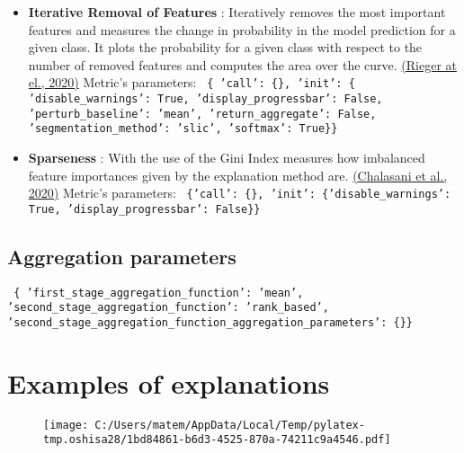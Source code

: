 \documentclass{article}%
\begin{document}
\begin{itemize}
{                'similarity\_func': difference\}\} \newline%
%
}%
\item%
\textbf{Iterative Removal of Features}%
: Iteratively removes the most important features and measures the change in probability in the model prediction for a given class. It plots the probability for a given class with respect to the number of removed features and computes the area over the curve.%
\href{https://arxiv.org/abs/2003.08747}{(Rieger at el., 2020)}%
\newline%
%
Metric's parameters: \newline%
%
\texttt{%
\{   'call': \{\},\newline%
    'init': \{   'disable\_warnings': True,\newline%
                'display\_progressbar': False,\newline%
                'perturb\_baseline': 'mean',\newline%
                'return\_aggregate': False,\newline%
                'segmentation\_method': 'slic',\newline%
                'softmax': True\}\} \newline%
%
}%
\item%
\textbf{Sparseness}%
: With the use of the Gini Index measures how imbalanced feature importances given by the explanation method are.%
\href{https://arxiv.org/abs/1810.06583}{(Chalasani et al., 2020)}%
\newline%
%
Metric's parameters: \newline%
%
\texttt{%
\{'call': \{\}, 'init': \{'disable\_warnings': True, 'display\_progressbar': False\}\} \newline%
%
}%
\end{itemize}

%
\subsection*{Aggregation parameters}%
\label{subsec:Aggregationparameters}%
\texttt{%
\{   'first\_stage\_aggregation\_function': 'mean',\newline%
    'second\_stage\_aggregation\_function': 'rank\_based',\newline%
    'second\_stage\_aggregation\_function\_aggregation\_parameters': \{\}\}%
}

%
\newpage%
\section*{Examples of explanations}%
\label{sec:Examplesofexplanations}%


\begin{figure}[!h]%
\centering%
\texttt{[image: C:/Users/matem/AppData/Local/Temp/pylatex-tmp.oshisa28/1bd84861-b6d3-4525-870a-74211c9a4546.pdf]}%
\end{figure}

%
\end{document}
